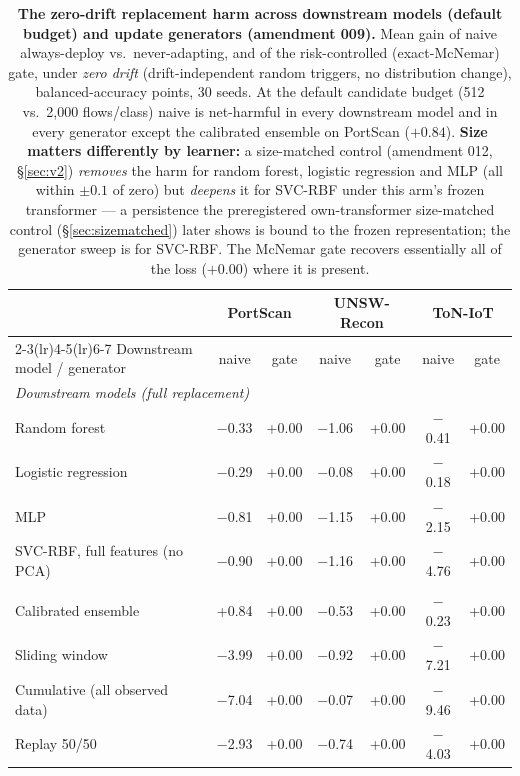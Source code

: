 \begin{table}[t]
\centering
\caption{\textbf{The zero-drift replacement harm across downstream models (default budget) and update generators (amendment 009).} Mean gain of naive always-deploy vs.\ never-adapting, and of the risk-controlled (exact-McNemar) gate, under \emph{zero drift} (drift-independent random triggers, no distribution change), balanced-accuracy points, 30 seeds. At the default candidate budget (512 vs.\ 2{,}000 flows/class) naive is net-harmful in every downstream model and in every generator except the calibrated ensemble on PortScan ($+0.84$). \textbf{Size matters differently by learner:} a size-matched control (amendment 012, \S\ref{sec:v2}) \emph{removes} the harm for random forest, logistic regression and MLP (all within $\pm0.1$ of zero) but \emph{deepens} it for SVC-RBF under this arm's frozen transformer --- a persistence the preregistered own-transformer size-matched control (\S\ref{sec:sizematched}) later shows is bound to the frozen representation; the generator sweep is for SVC-RBF. The McNemar gate recovers essentially all of the loss ($+0.00$) where it is present.}
\label{tab:amendment009}
\small
\begin{tabular}{l cc cc cc}
\toprule
 & \multicolumn{2}{c}{PortScan} & \multicolumn{2}{c}{UNSW-Recon} & \multicolumn{2}{c}{ToN-IoT} \\
\cmidrule(lr){2-3}\cmidrule(lr){4-5}\cmidrule(lr){6-7}
Downstream model / generator & naive & gate & naive & gate & naive & gate \\
\midrule
\multicolumn{7}{l}{\emph{Downstream models (full replacement)}} \\
Random forest & $-$0.33 & +0.00 & $-$1.06 & +0.00 & $-$0.41 & +0.00 \\
Logistic regression & $-$0.29 & +0.00 & $-$0.08 & +0.00 & $-$0.18 & +0.00 \\
MLP & $-$0.81 & +0.00 & $-$1.15 & +0.00 & $-$2.15 & +0.00 \\
SVC-RBF, full features (no PCA) & $-$0.90 & +0.00 & $-$1.16 & +0.00 & $-$4.76 & +0.00 \\
\addlinespace
\multicolumn{7}{l}{\emph{Update generators (SVC-RBF)}} \\
Calibrated ensemble & +0.84 & +0.00 & $-$0.53 & +0.00 & $-$0.23 & +0.00 \\
Sliding window & $-$3.99 & +0.00 & $-$0.92 & +0.00 & $-$7.21 & +0.00 \\
Cumulative (all observed data) & $-$7.04 & +0.00 & $-$0.07 & +0.00 & $-$9.46 & +0.00 \\
Replay 50/50 & $-$2.93 & +0.00 & $-$0.74 & +0.00 & $-$4.03 & +0.00 \\
\bottomrule
\end{tabular}

\end{table}
